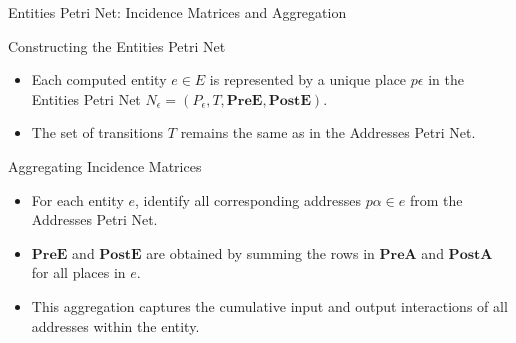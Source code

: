 \documentclass{beamer}
\begin{document}
\begin{frame}{Entities Petri Net: Incidence Matrices and Aggregation}
    \footnotesize
    \begin{block}{Constructing the Entities Petri Net}
        \begin{itemize}
            \item Each computed entity \(e \in E\) is represented by a unique place \(p\epsilon\) in the Entities Petri Net \(N_{\epsilon}=(P_{\epsilon}, T, \mathbf{PreE}, \mathbf{PostE})\).
            \item The set of transitions \(T\) remains the same as in the Addresses Petri Net.
        \end{itemize}
    \end{block}

    \begin{block}{Aggregating Incidence Matrices}
        \begin{itemize}
            \item For each entity \(e\), identify all corresponding addresses \(p\alpha \in e\) from the Addresses Petri Net.
            \item \(\mathbf{PreE}\) and \(\mathbf{PostE}\) are obtained by summing the rows in \(\mathbf{PreA}\) and \(\mathbf{PostA}\) for all places in \(e\).
            \item This aggregation captures the cumulative input and output interactions of all addresses within the entity.
        \end{itemize}
    \end{block}
\end{frame}
\end{document}
